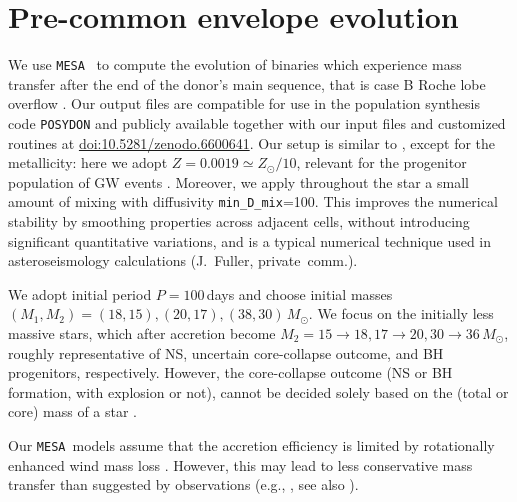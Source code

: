 \documentclass[twocolumn,twocolappendix,trackchanges]{aastex63}
\newcommand{\code}[1]{\texttt{#1}}
\newcommand{\mesa}{\code{MESA}}
\begin{document}
\section{Pre-common envelope evolution}
\label{sec:methods}

We use \mesa\ \citep[version 15140,][]{paxton:2011, paxton:2013,
  paxton:2015, paxton:2018, paxton:2011} to compute the evolution of
binaries which experience mass transfer after the end of the donor's
main sequence, that is case B Roche lobe overflow
\citep[RLOF,][]{kippenhahn:1967}. Our output files are compatible for
use in the population synthesis code \code{POSYDON}
\citep{fragos:2022} and publicly available together with our input
files and customized routines at \href{https://zenodo.org/deposit/6600641}{doi:10.5281/zenodo.6600641}. Our
setup is similar to \cite{renzo:2021zoph}, except for the metallicity:
here we adopt $Z=0.0019\simeq Z_\odot/10$, relevant for the progenitor
population of GW events \citep[e.g.,][]{vanson:2021}. Moreover, we
apply throughout the star a small amount of mixing with diffusivity
\texttt{min\_D\_mix}=100. This improves the numerical stability by
smoothing properties across adjacent cells, without introducing
significant quantitative variations, and is a typical numerical
technique used in asteroseismology calculations (J.~Fuller,
private~comm.).

We adopt initial period $P=100$\,days and choose initial masses
$(M_{1}, M_{2}) = (18, 15), (20, 17), (38, 30)\,M_\odot$. We focus on
the initially less massive stars, which after accretion become
$M_2=15\rightarrow 18, 17\rightarrow 20, 30\rightarrow 36\,M_\odot$,
roughly representative of NS, uncertain core-collapse outcome, and BH
progenitors, respectively. However, the core-collapse outcome (NS or
BH formation, with explosion or not), cannot be decided solely based
on the (total or core) mass of a star \citep[e.g.,][]{oconnor:11,
  farmer:16, patton:20, zapartas:21b, patton:22}.

Our \mesa\ models assume that the
accretion efficiency is limited by rotationally enhanced wind mass
loss \citep[e.g.,][]{sravan:2019, wang:2020, renzo:2021zoph,
  sen:2022}. However, this may lead to less conservative mass transfer
than suggested by observations (e.g., \citealt{wang:2021a}, see also
\citealt{renzo:2021zoph}).
\end{document}
